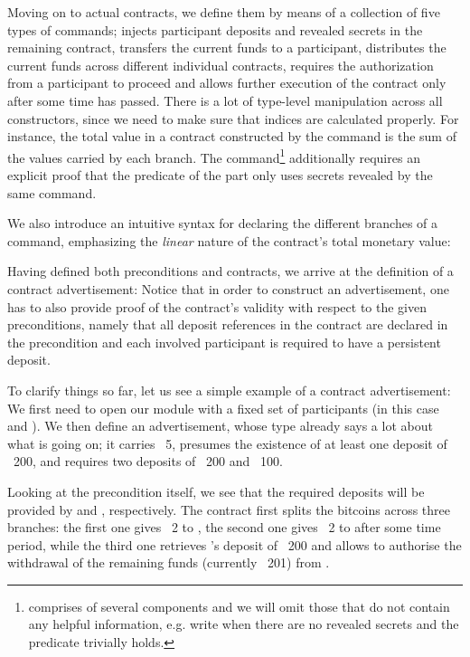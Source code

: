 \documentclass[acmsmall,nonacm=true,screen=true]{acmart}
\begin{document}
Moving on to actual contracts, we define them by means of a collection of five types of commands;
\inlinePut{} injects participant deposits and revealed secrets in the remaining contract,
\inlineWithdraw{} transfers the current funds to a participant,
\inlineSplit{} distributes the current funds across different individual contracts,
\inlineAuthDecoration{} requires the authorization from a participant to proceed
and \inlineTimeDecoration{} allows further execution of the contract only after some time has passed.
\BITcontracts{}
There is a lot of type-level manipulation across all constructors, since we need to make sure that indices are
calculated properly. For instance, the total value in a contract constructed by the \inlineSplit{} command is the 
sum of the values carried by each branch.
The \inlinePut{} command\footnote{
\inlinePut{} comprises of several components and we will omit those that do not contain any helpful information,
e.g. write \inlineSimplePut{} when there are no revealed secrets and the predicate trivially holds.
} additionally requires an explicit proof that the predicate
of the \inlineIf{} part only uses secrets revealed by the same command.

We also introduce an intuitive syntax for declaring the different branches of a \inlineSplit{} command, emphasizing the
\textit{linear} nature of the contract's total monetary value:
\BITlollipop{}

Having defined both preconditions and contracts, we arrive at the definition of a contract advertisement:
\BITadvertisements{}
Notice that in order to construct an advertisement, one has to also provide proof of the contract's validity with respect to
the given preconditions, namely that all deposit references in the contract are declared in the precondition
and each involved participant is required to have a persistent deposit.

To clarify things so far, let us see a simple example of a contract advertisement:
\BITexampleAdvertisement{}
We first need to open our module with a fixed set of participants (in this case \inlineA{} and \inlineB{}).
We then define an advertisement, whose type already says a lot about what is going on;
it carries \bitcoin ~5, presumes the existence of at least one deposit of \bitcoin ~200, and requires two deposits
of \bitcoin ~200 and \bitcoin ~100.

Looking at the precondition itself, we see that the required deposits will be provided by \inlineB{} and \inlineA{}, respectively.
The contract first splits the bitcoins across three branches:
the first one gives \bitcoin ~2 to \inlineB{}, the second one gives \bitcoin ~2 to \inlineA{} after some time period,
while the third one retrieves \inlineB{}'s deposit of \bitcoin ~200 and allows \inlineB{} to authorise the
withdrawal of the remaining funds (currently \bitcoin ~201) from \inlineA{}.
\end{document}
